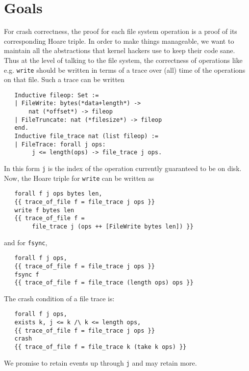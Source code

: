 \documentclass[11pt, twocolumn, letterpaper]{article}
\newcommand{\coqsize}{\scriptsize}
\begin{document}
\section{Goals}

%

For crash correctness, the proof for each file system operation is a
proof of its corresponding Hoare triple.
In order to make things manageable, we want to maintain all the
abstractions that kernel hackers use to keep their code sane.
Thus at the level of talking to the file system, the correctness of
operations like e.g. \texttt{write} should be written in terms of
a trace over (all) time of the operations on that file.
Such a trace can be written

{\coqsize
\begin{verbatim}
   Inductive fileop: Set :=
   | FileWrite: bytes(*data+length*) ->
       nat (*offset*) -> fileop
   | FileTruncate: nat (*filesize*) -> fileop
   end.
   Inductive file_trace nat (list fileop) :=
   | FileTrace: forall j ops:
        j <= length(ops) -> file_trace j ops.
\end{verbatim}
}

In this form \texttt{j} is the index of the operation currently
guaranteed to be on disk.
Now, the Hoare triple for \texttt{write} can be written as

{\coqsize
\begin{verbatim}
   forall f j ops bytes len,
   {{ trace_of_file f = file_trace j ops }}
   write f bytes len
   {{ trace_of_file f =
        file_trace j (ops ++ [FileWrite bytes len]) }}
\end{verbatim}
}
and for \texttt{fsync},
{\coqsize
\begin{verbatim}
   forall f j ops,
   {{ trace_of_file f = file_trace j ops }}
   fsync f
   {{ trace_of_file f = file_trace (length ops) ops }}
\end{verbatim}
}
The crash condition of a file trace is:
{\coqsize
\begin{verbatim}
   forall f j ops,
   exists k, j <= k /\ k <= length ops,
   {{ trace_of_file f = file_trace j ops }}
   crash
   {{ trace_of_file f = file_trace k (take k ops) }}
\end{verbatim}
}
We promise to retain events up through \texttt{j} and may
retain more.
\end{document}
